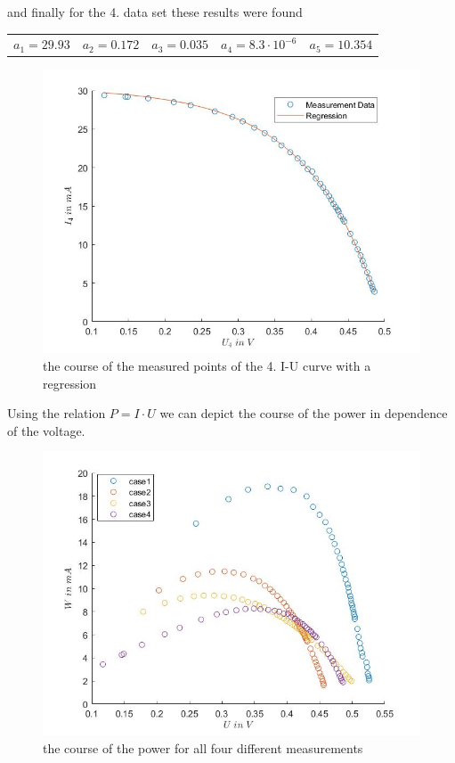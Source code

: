 \documentclass[a4paper, 12pt]{scrartcl}
\begin{document}
and finally for the 4. data set these results were found\newline\newline
\begin{tabular}{ccccc}$a_1=29.93$&$a_2=0.172$&$a_3=0.035$&$a_4=8.3\cdot10^{-6}$&$a_5=10.354$\end{tabular}
\begin{figure}[H]\includegraphics[scale=0.4]{gef. KL 4}\caption{the course of the measured points of the 4. I-U curve with a regression}\end{figure}
\newpage
Using the relation $P=I\cdot{U}$ we can depict the course of the power in dependence of the voltage.
\begin{figure}[H]\centering\includegraphics[scale=0.7]{Ptot}\caption{the course of the power for all four different measurements}\end{figure}
\end{document}
